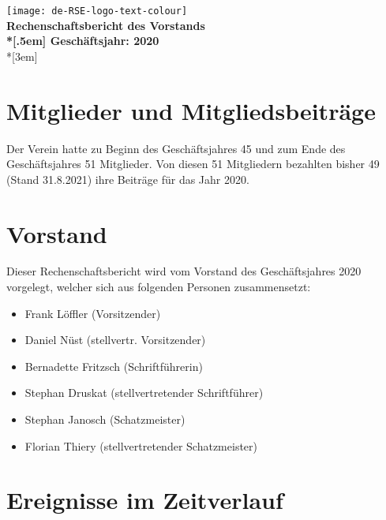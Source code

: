 \newcommand{\jahr}{2020}



\thispagestyle{empty}

\begin{centering}
\texttt{[image: de-RSE-logo-text-colour]}\\
\vspace{3em}
\textbf{
 \Large Rechenschaftsbericht des Vorstands\\*[.5em]
 \normalsize Geschäftsjahr: \jahr}\\*[3em]
\end{centering}

\section{Mitglieder und Mitgliedsbeiträge}

Der Verein hatte zu Beginn des Geschäftsjahres 45 und zum Ende des Geschäftsjahres 51 Mitglieder. Von diesen 51 Mitgliedern bezahlten bisher 49 (Stand  31.8.2021) ihre Beiträge für das Jahr 2020.

\section{Vorstand}

Dieser Rechenschaftsbericht wird vom Vorstand des Geschäftsjahres 2020 vorgelegt, welcher sich aus folgenden Personen zusammensetzt:

\begin{itemize}
  \setlength{\itemsep}{0pt plus 1pt}
  \item Frank Löffler (Vorsitzender)
  \item Daniel Nüst (stellvertr. Vorsitzender)
  \item Bernadette Fritzsch (Schriftführerin)
  \item Stephan Druskat (stellvertretender Schriftführer)
  \item Stephan Janosch (Schatzmeister)
  \item Florian Thiery (stellvertretender Schatzmeister)
\end{itemize}

\section{Ereignisse im Zeitverlauf}

